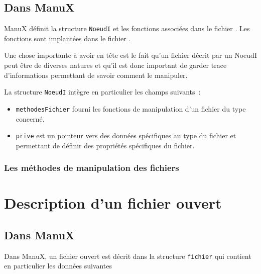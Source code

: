 %
\subsection{Dans ManuX}

   ManuX définit la structure \lstinline!NoeudI! et les fonctions
associées  dans le fichier . Les
fonctions sont implantées dans le fichier .

   Une chose importante à avoir en tête est le fait qu'un fichier
décrit par un NoeudI peut être de diverses natures et qu'il est donc
important de garder trace d'informations permettant de savoir comment
le manipuler.

   La structure \lstinline!NoeudI! intègre en particulier les champs
suivants~:

\begin{itemize}
   \item \lstinline!methodesFichier! fourni les fonctions de
     manipulation d'un fichier du type concerné.
   \item \lstinline!prive! est un pointeur vers des données
     spécifiques au type du fichier et permettant de définir des
     propriétés spécifiques du fichier.
\end{itemize}
    
\subsubsection{Les méthodes de manipulation des fichiers}

%
\section{Description d'un fichier ouvert}

%
\subsection{Dans ManuX}

   Dans ManuX, un fichier ouvert est décrit dans la structure
\lstinline!fichier! qui contient en particulier les données suivantes
   

